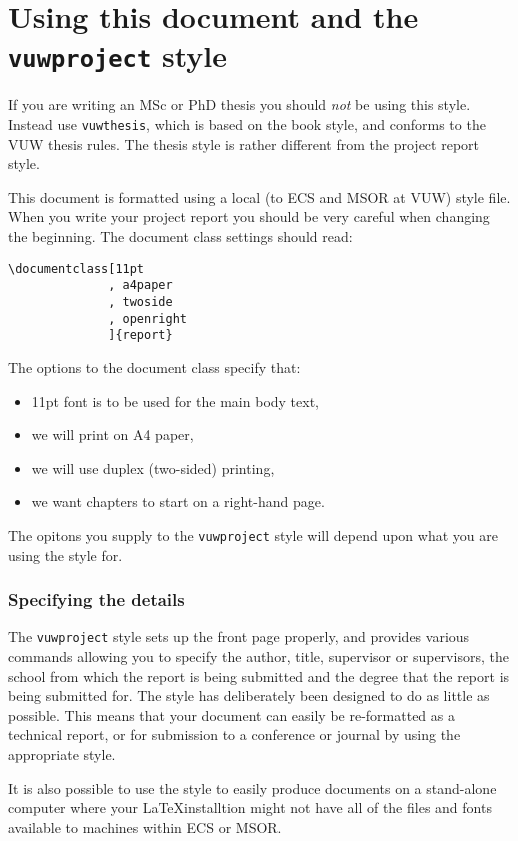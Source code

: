 \chapter{Using this document and the \texttt{vuwproject} style}\label{C:us}

If you are writing an MSc or PhD thesis you should \emph{not} be using this style. Instead use \verb=vuwthesis=, which is based on the book style, and conforms to the VUW thesis rules. The thesis style is rather different from the project report style. 

This document is formatted using a local (to ECS and MSOR at VUW) style file. When you write your project report you should be very careful when changing the beginning. The document class settings should read:

\begin{verbatim}
\documentclass[11pt
              , a4paper
              , twoside
              , openright
              ]{report}
\end{verbatim}
The options to the document class specify that:
\begin{itemize}
\item 11pt font is to be used for the main body text,
\item  we will print on A4 paper, 
\item we will use duplex (two-sided) printing,
\item we want chapters to start on a right-hand page. 
\end{itemize}

The opitons you supply to the  \texttt{vuwproject} style will depend upon
what you are using the style for.

\subsection{Specifying the details}
The \texttt{vuwproject} style sets up the front page properly, and provides various commands allowing you to specify the author, title, supervisor or supervisors, the school from which the report is being submitted and the degree that the report is being submitted for. The style has deliberately been designed to do as little as possible. This means that your document can easily be re-formatted as a technical report, or for submission to a conference or journal by using the appropriate style.

It is also possible to use the style to easily produce documents on a
stand-alone computer where your \LaTeX installtion might not have all
of the  files and fonts available to machines within ECS or MSOR.

